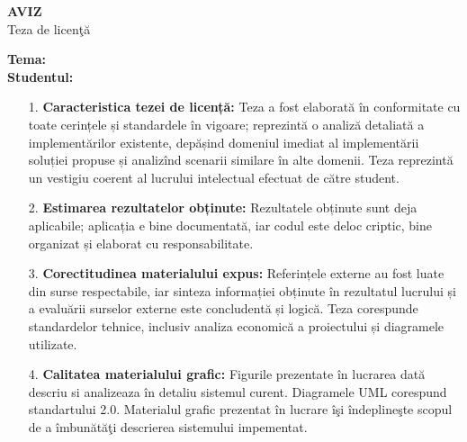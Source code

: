 \begin{titlepage}

    \newcommand{\HRule}{\rule{\linewidth}{0.5mm}}
    
    \UniversityHeader
    \center
    
    \vspace{0.3cm}
    \begin{center}
        \large \textbf{AVIZ} \\
        Teza de licenţă \\
    \vspace{0.2cm}
    
    \end{center}
    
    \begin{flushleft}
        \textbf{Tema:} \ThesisTitle \\
        \textbf{Studentul:} \MyNameFull
        
        \begin{enumerate}[leftmargin=1.4em, itemsep=1pt, parsep=0pt]
        \item [1.] \textbf{Caracteristica tezei de licență:}  Teza a fost elaborată în conformitate cu toate cerințele și standardele în vigoare; reprezintă o analiză detaliată a implementărilor existente, depășind domeniul imediat al implementării soluției propuse și analizînd scenarii similare în alte domenii. Teza reprezintă un vestigiu coerent al lucrului intelectual efectuat de către student.
        
        \item [2.] \textbf{Estimarea rezultatelor obținute:} Rezultatele obținute sunt deja aplicabile; aplicația e bine documentată, iar codul este deloc criptic, bine organizat și elaborat cu responsabilitate.
        
        \item [3.] \textbf{Corectitudinea materialului expus:} Referințele externe au fost luate din surse respectabile, iar sinteza informației obținute în rezultatul lucrului și a evaluării surselor externe este concludentă și logică. Teza corespunde standardelor tehnice, inclusiv analiza economică a proiectului și diagramele utilizate. 
        
        \item [4.] \textbf{Calitatea materialului grafic:} Figurile prezentate în lucrarea dată descriu si analizeaza în detaliu sistemul curent. Diagramele UML corespund standartului 2.0. Materialul grafic prezentat în lucrare îşi îndeplineşte scopul de a îmbunătăţi descrierea sistemului impementat.
        

\end{enumerate}
\end{flushleft}
\end{titlepage}
